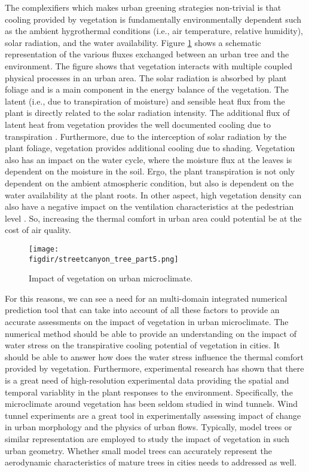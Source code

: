 The complexifiers which makes urban greening strategies non-trivial is that cooling provided by vegetation is fundamentally environmentally dependent such as the ambient hygrothermal conditions (i.e., air temperature, relative humidity), solar radiation, and the water availability. Figure \ref{fig:vegetation_fluxes} shows a schematic representation of the various fluxes exchanged between an urban tree and the environment. The figure shows that vegetation interacts with multiple coupled physical processes in an urban area. The solar radiation is absorbed by plant foliage and is a main component in the energy balance of the vegetation. The latent (i.e., due to transpiration of moisture) and sensible heat flux from the plant is directly related to the solar radiation intensity. The additional flux of latent heat from vegetation provides the well documented cooling due to transpiration \citep{Oke2017,Farquhar2007, abtew2012evaporation,Melesse2008}. Furthermore, due to the interception of solar radiation by the plant foliage, vegetation provides additional cooling due to shading. Vegetation also has an impact on the water cycle, where the moisture flux at the leaves is dependent on the moisture in the soil. Ergo, the plant transpiration is not only dependent on the ambient atmospheric condition, but also is dependent on the water availability at the plant roots. In other aspect, high vegetation density can also have a negative impact on the ventilation characteristics at the pedestrian level \citep{Gromke2011,Gromke2008}. So, increasing the thermal comfort in urban area could potential be at the cost of air quality. 

\begin{figure}[t]
	\centering
	\texttt{[image: \\figdir/streetcanyon\_tree\_part5.png]}
	\caption{Impact of vegetation on urban microclimate.}
	\label{fig:vegetation_fluxes}
\end{figure}

For this reasons, we can see a need for an multi-domain integrated numerical prediction tool that can take into account of all these factors to provide an accurate assessments on the impact of vegetation in urban microclimate. The numerical method should be able to provide an understanding on the impact of water stress on the transpirative cooling potential of vegetation in cities. It should be able to answer how does the water stress influence the thermal comfort provided by vegetation. Furthermore, experimental research has shown that there is a great need of high-resolution experimental data providing the spatial and temporal variablity in the plant responses to the environment. Specifically, the microclimate around vegetation has been seldom studied in wind tunnels. Wind tunnel experiments are a great tool in experimentally assessing impact of change in urban morphology and the physics of urban flows. Typically, model trees or similar representation are employed to study the impact of vegetation in such urban geometry. Whether small model trees can accurately represent the aerodynamic characteristics of mature trees in cities needs to addressed as well. 

